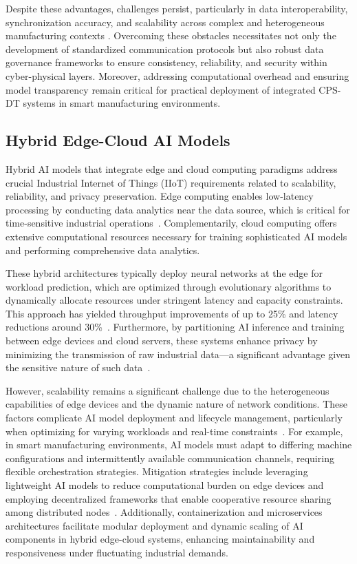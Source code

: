 \documentclass[sigconf]{acmart}
\begin{document}
Despite these advantages, challenges persist, particularly in data interoperability, synchronization accuracy, and scalability across complex and heterogeneous manufacturing contexts \cite{ref13}. Overcoming these obstacles necessitates not only the development of standardized communication protocols but also robust data governance frameworks to ensure consistency, reliability, and security within cyber-physical layers. Moreover, addressing computational overhead and ensuring model transparency remain critical for practical deployment of integrated CPS-DT systems in smart manufacturing environments.

\subsection{Hybrid Edge-Cloud AI Models}

Hybrid AI models that integrate edge and cloud computing paradigms address crucial Industrial Internet of Things (IIoT) requirements related to scalability, reliability, and privacy preservation. Edge computing enables low-latency processing by conducting data analytics near the data source, which is critical for time-sensitive industrial operations~\cite{ref15}. Complementarily, cloud computing offers extensive computational resources necessary for training sophisticated AI models and performing comprehensive data analytics.

These hybrid architectures typically deploy neural networks at the edge for workload prediction, which are optimized through evolutionary algorithms to dynamically allocate resources under stringent latency and capacity constraints. This approach has yielded throughput improvements of up to 25\% and latency reductions around 30\%~\cite{ref31}. Furthermore, by partitioning AI inference and training between edge devices and cloud servers, these systems enhance privacy by minimizing the transmission of raw industrial data—a significant advantage given the sensitive nature of such data~\cite{ref22}.

However, scalability remains a significant challenge due to the heterogeneous capabilities of edge devices and the dynamic nature of network conditions. These factors complicate AI model deployment and lifecycle management, particularly when optimizing for varying workloads and real-time constraints~\cite{ref33}. For example, in smart manufacturing environments, AI models must adapt to differing machine configurations and intermittently available communication channels, requiring flexible orchestration strategies. Mitigation strategies include leveraging lightweight AI models to reduce computational burden on edge devices and employing decentralized frameworks that enable cooperative resource sharing among distributed nodes~\cite{ref31,ref33}. Additionally, containerization and microservices architectures facilitate modular deployment and dynamic scaling of AI components in hybrid edge-cloud systems, enhancing maintainability and responsiveness under fluctuating industrial demands.
\end{document}
